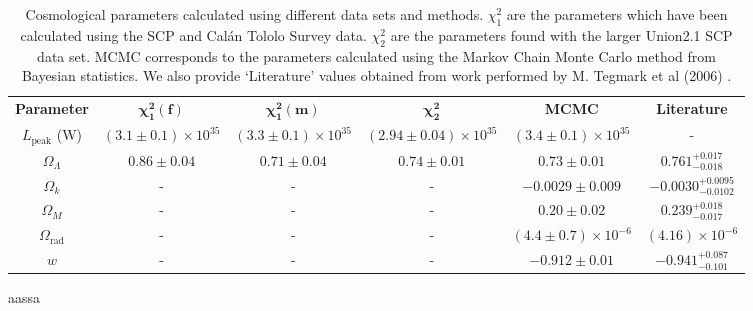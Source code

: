 \documentclass[twocolumn]{revtex4}
\begin{document}
{\renewcommand{\arraystretch}{1.2}%
\begin{table}[t]
\centering
\begin{tabular}{c@{\hskip 15pt}c@{\hskip 15pt}c@{\hskip 15pt}c@{\hskip 15pt}c@{\hskip 15pt}c} 
 \hline
 \textbf{Parameter} & \textbf{$\boldsymbol{\chi^2_{1}(f)}$} & \textbf{$\boldsymbol{\chi^2_{1}(m)}$} & \textbf{$\boldsymbol{\chi^2_2}$} & \textbf{MCMC} & \textbf{Literature} \\ [0.5ex] 
 $L_{\text{peak}}$ (W) & $(3.1\pm0.1)\times 10^{35}$ & $(3.3\pm0.1)\times 10^{35}$ & $(2.94\pm0.04)\times 10^{35}$ & $(3.4\pm0.1 ) \times 10^{35}$ & -\\
 $\Omega_\Lambda$ & $0.86\pm0.04$ &  $0.71\pm0.04$ & $0.74\pm0.01$ & $0.73\pm0.01$ & $0.761^{+0.017}_{-0.018}$ \\
 $\Omega_k$ & - & - & - & $-0.0029\pm0.009$ & $-0.0030^{+0.0095}_{-0.0102}$ \\
 $\Omega_M$ & - & - & - & $0.20\pm0.02$ & $0.239^{+0.018}_{-0.017}$ \\
 $\Omega_\text{rad}$ & - & - & - & $(4.4\pm0.7)\times10^{-6}$ & $(4.16)\times10^{-6}$ \\
 $w$ & - & - & - & $-0.912\pm0.01$ & $-0.941^{+0.087}_{-0.101}$ \\
 \hline
\end{tabular}
\caption{Cosmological parameters calculated using different data sets and methods. $\chi^2_1$ are the parameters which have been calculated using the SCP and Cal\'{a}n Tololo Survey data. $\chi^2_2$ are the parameters found with the larger Union2.1 SCP data set. MCMC corresponds to the parameters calculated using the Markov Chain Monte Carlo method from Bayesian statistics. We also provide `Literature' values obtained from work performed by M. Tegmark et al (2006) \cite{cosmo_constraints}.}
\vspace{-0.5em}
\label{table:cosmo_parameters}
\end{table}

aassa

}
\end{document}
